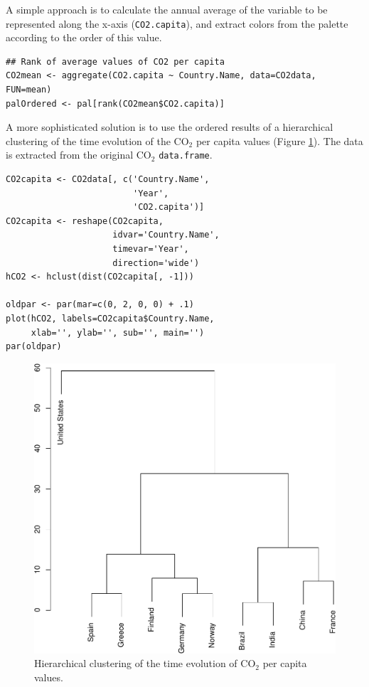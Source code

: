 A simple approach is to calculate the annual average of the
variable to be represented along the x-axis (\texttt{CO2.capita}), and
extract colors from the palette according to the order of this
value.  


\lstset{language=r,label= ,caption= ,captionpos=b,numbers=none}
\begin{lstlisting}
## Rank of average values of CO2 per capita
CO2mean <- aggregate(CO2.capita ~ Country.Name, data=CO2data, FUN=mean)
palOrdered <- pal[rank(CO2mean$CO2.capita)]  
\end{lstlisting}

A more sophisticated solution is to use the ordered results of a
hierarchical clustering of the time evolution of the \(\mathrm{CO_2}\) per capita
values (Figure \ref{fig:hclustCO2}). The data is extracted from the
original \(\mathrm{CO_2}\) \texttt{data.frame}.  


\lstset{language=r,label= ,caption= ,captionpos=b,numbers=none}
\begin{lstlisting}
CO2capita <- CO2data[, c('Country.Name',
                         'Year',
                         'CO2.capita')]
CO2capita <- reshape(CO2capita,
                     idvar='Country.Name',
                     timevar='Year',
                     direction='wide')
hCO2 <- hclust(dist(CO2capita[, -1]))

oldpar <- par(mar=c(0, 2, 0, 0) + .1)
plot(hCO2, labels=CO2capita$Country.Name,
     xlab='', ylab='', sub='', main='')
par(oldpar)
\end{lstlisting}

\begin{figure}[htbp]
\centering
\includegraphics[width=.9\linewidth]{figs/hclust.pdf}
\caption{Hierarchical clustering of the time evolution of \(\mathrm{CO_2}\) per capita values. \label{fig:hclustCO2}}
\end{figure}


